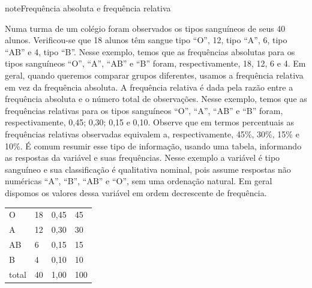 \begin{sphinxadmonition}{note}{Frequência absoluta e frequência relativa}

Numa turma de um colégio foram observados os tipos sanguíneos de seus 40 alunos. Verificou-se que 18 alunos têm sangue tipo ``O'', 12, tipo ``A'', 6, tipo ``AB'' e 4, tipo ``B''. Nesse exemplo, temos que as frequências absolutas para os tipos sanguíneos ``O'', ``A'', ``AB'' e ``B'' foram, respectivamente, 18, 12, 6 e 4. Em geral, quando queremos comparar grupos diferentes, usamos a frequência relativa em vez da frequência absoluta. A frequência relativa é dada pela razão entre a frequência absoluta e o número total de observações. Nesse exemplo, temos que as frequências relativas para os tipos sanguíneos ``O'', ``A'', ``AB'' e ``B'' foram, respectivamente, 0,45; 0,30; 0,15 e 0,10. Observe que em termos percentuais as frequências relativas observadas equivalem a, respectivamente, 45\%, 30\%, 15\% e 10\%.
É comum resumir esse tipo de informação, usando uma tabela, informando as respostas da variável e suas frequências. Nesse exemplo a variável é tipo sanguíneo e sua classificação é qualitativa nominal, pois assume respostas não numéricas ``A'', ``B'', ``AB'' e ``O'', sem uma ordenação natural. Em geral dispomos os valores dessa variável em ordem decrescente de frequência.


\begin{savenotes}\sphinxattablestart
\centering
\begin{tabulary}{\linewidth}[t]{|T|T|T|T|}
\hline
{}\relax &\relax &\relax &\relax \\
\hline
O
&
18
&
0,45
&
45
\\
\hline
A
&
12
&
0,30
&
30
\\
\hline
AB
&
6
&
0,15
&
15
\\
\hline
B
&
4
&
0,10
&
10
\\
\hline
total
&
40
&
1,00
&
100
\\
\hline
\end{tabulary}
\par
\sphinxattableend\end{savenotes}
\end{sphinxadmonition}

